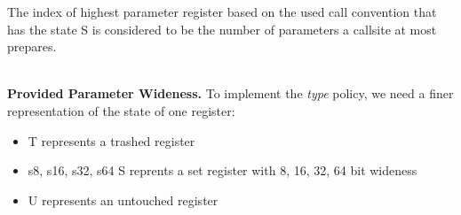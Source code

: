 %
%
%

The index of highest parameter register based on the used call convention that has the state S is considered to be the number of parameters a callsite at most prepares.

~\\
\textbf{Provided Parameter Wideness.}
\label{subsection:providedparamwideness}
To implement the \emph{type} policy, we need a finer representation of the state of one register:

\begin{itemize}
\item T represents a trashed register
\item s8, s16, s32, s64 S reprents a set register with  8, 16, 32, 64 bit  wideness
\item U represents an untouched register
\end{itemize}

